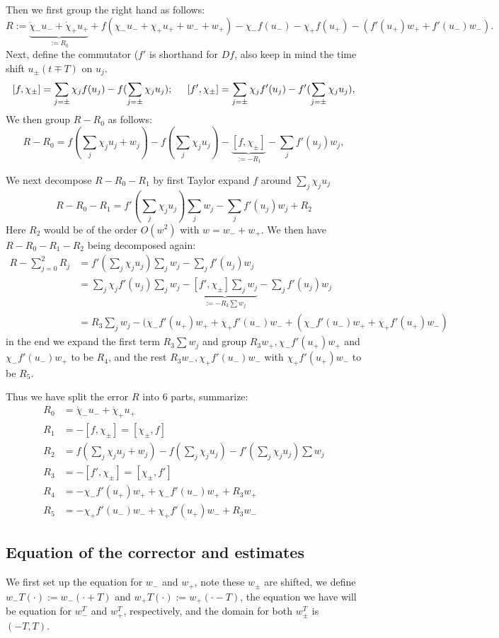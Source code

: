 \documentclass[letterpaper,11pt]{article}
\numberwithin{equation}{section}
\theoremstyle{plain}
\begin{document}
Then we first group the right hand as follows:
\[
R:=\underbrace{ \dot{\chi}_-  u_- + \dot{\chi}_+ u_+}_{:=R_0} + f(\chi_-u_-+\chi_+u_+ + w_- + w_+) - \chi_- f(u_-)-\chi_+f(u_+)-(f'(u_+)w_+ +f'(u_-)w_-).
\]
Next, define the commutator ($f'$ is shorthand for $Df$, also keep in mind the time shift $u_\pm(t\mp T)$ on $u_j$.
\[
[f,\chi_{\pm}] = \sum_{j=\pm} \chi_j f(u_j) - f(\sum_{j=\pm} \chi_ju_j); \hspace{0.2in} [f',\chi_{\pm}] = \sum_{j=\pm} \chi_j f'(u_j) - f'(\sum_{j=\pm} \chi_ju_j),
\]
We then group $R-R_0$ as follows:
\[
R-R_0 =  f(\sum_j \chi_ju_j + w_j) - f(\sum_j \chi_j u_j) -\underbrace{ [f,\chi_{\pm}] }_{:= -R_1}-\sum_{j} f'(u_j)w_j,
\]

We next decompose $R-R_0-R_1$ by first Taylor expand $f$ around $\sum_j \chi_j u_j$
\[
R-R_0-R_1 = f'(\sum_j \chi_ju_j) \sum_j w_j -\sum_{j} f'(u_j)w_j+ R_2
\]
Here $R_2$ would be of the order $O(w^2)$ with $w = w_-+w_+$.	
We then have $R-R_0-R_1-R_2$ being decomposed again:
\begin{align*}
R-\sum_{j=0}^2 R_j &= f'(\sum_j \chi_ju_j) \sum_j w_j -\sum_{j} f'(u_j)w_j\\ &= \sum_{j} \chi_jf'(u_j) \sum_j w_j -\underbrace{ [f', \chi_{\pm}]\sum_j w_{j} }_{:=-R_3\sum w_j} -\sum_{j} f'(u_j)w_j \\
&= R_3\sum_j w_j -( \chi_-f'(u_+)w_+ + \chi_+ f'(u_-)w_- + (\chi_-f'(u_-)w_++\chi_+f'(u_+)w_-)
\end{align*}
in the end we expand the first term $R_3\sum w_j$ and group $R_3w_+, \chi_-f'(u_+)w_+$ and $\chi_-f'(u_-)w_+$ to be $R_4$, and the rest $R_3w_-, \chi_+f'(u_-)w_-$ with $\chi_+f'(u_+)w_-$ to be $R_5$.


Thus we have split the error $R$ into $6$ parts, summarize:
\begin{align*}
R_0 &= \dot{\chi}_-  u_- + \dot{\chi}_+ u_+\\
R_1 &= -[f,\chi_{\pm}]=[\chi_{\pm},f]\\
R_2 &= f(\sum_j \chi_ju_j+w_j)-f(\sum_j \chi_j u_j)-f'(\sum_j \chi_ju_j) \sum w_j\\
R_3 &= -[f', \chi_{\pm}] = [\chi_{\pm},f']\\
R_4 &= -  \chi_-f'(u_+)w_+ + \chi_-f'(u_-)w_+ + R_3w_+ \\
R_5 &= -\chi_+ f'(u_-)w_-+\chi_+f'(u_+)w_-+R_3w_-
\end{align*}
\subsection{Equation of the corrector and estimates}
We first set up the equation for $w_-$ and $w_+$, note these $w_{\pm}$ are shifted, we define $w_-T(\cdot) :=w_-(\cdot + T)$ and $w_+T(\cdot) :=w_+(\cdot - T)$, the equation we have will be equation for $w_-^T$ and $w_+^T$, respectively, and the domain for both $w_{\pm}^T$ is $(-T,T)$.
\end{document}
